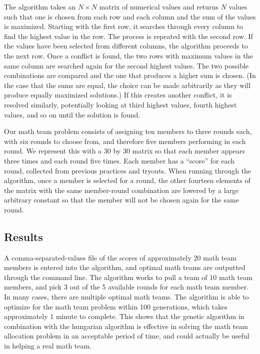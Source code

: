 \documentclass[11pt,a4paper]{article}
\begin{document}
The algorithm takes an $N \times N$ matrix of numerical values and returns $N$ values such that one is chosen from each row and each column and the sum of the values is maximized. Starting with the first row, it searches through every column to find the highest value in the row. The process is repeated with the second row. If the values have been selected from different columns, the algorithm proceeds to the next row. Once a conflict is found, the two rows with maximum values in the same column are searched again for the second highest values. The two possible combinations are compared and the one that produces a higher sum is chosen. (In the case that the sums are equal, the choice can be made arbitrarily as they will produce equally maximized solutions.) If this creates another conflict, it is resolved similarly, potentially looking at third highest values, fourth highest values, and so on until the solution is found.

Our math team problem consists of assigning ten members to three rounds each, with six rounds to choose from, and therefore five members performing in each round. We represent this with a 30 by 30 matrix so that each member appears three times and each round five times. Each member has a ``score'' for each round, collected from previous practices and tryouts. When running through the algorithm, once a member is selected for a round, the other fourteen elements of the matrix with the same member-round combination are lowered by a large arbitrary constant so that the member will not be chosen again for the same round.

\subsection{Results}
\label{Genetic Algorithms:Results}

A comma-separated-values file of the scores of approximately 20 math team members is entered into the algorithm, and optimal math teams are outputted through the command line. The algorithm works to pull a team of 10 math team members, and pick 3 out of the 5 available rounds for each math team member. In many cases, there are multiple optimal math teams. The algorithm is able to optimize for the math team problem within 100 generations, which takes approximately 1 minute to complete. This shows that the genetic algorithm in combination with the hungarian algorithm is effective in solving the math team allocation problem in an acceptable period of time, and could actually be useful in helping a real math team.
\end{document}
